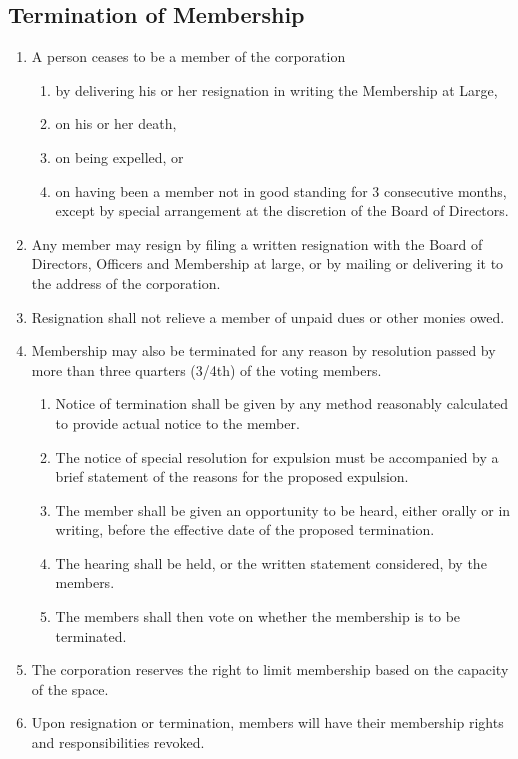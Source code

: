 \documentclass{article}
\begin{document}
\subsection{Termination of Membership}
\begin{enumerate}
    \item A person ceases to be a member of the corporation
    \begin{enumerate}
    \item by delivering his or her resignation in writing the Membership at
    Large,
    \item on his or her death,
    \item on being expelled, or
    \item on having been a member not in good standing for 3 consecutive months,
    except by special arrangement at the discretion of the Board of Directors.
    \end{enumerate}
    \item Any member may resign by filing a written resignation with the Board
    of Directors, Officers and Membership at large, or by mailing or delivering
    it to the address of the corporation.
    \item Resignation shall not relieve a member of unpaid dues or other monies
    owed.
    \item Membership may also be terminated for any reason by resolution passed
    by more than three quarters (3/4th) of the voting members.
    \begin{enumerate}
        \item Notice of termination shall be given by any method reasonably
    calculated to provide actual notice to the member.
        \item The notice of special resolution for expulsion must be accompanied
    by a brief statement of the reasons for the proposed expulsion.
        \item The member shall be given an opportunity to be heard, either
    orally or in writing, before the effective date of the proposed termination.
        \item The hearing shall be held, or the written statement considered, by
    the members.
        \item The members shall then vote on whether the membership is to be
    terminated.
    \end{enumerate}
    \item The corporation reserves the right to limit membership based on the
capacity of the space.
    \item Upon resignation or termination, members will have their membership
    rights and responsibilities revoked.
\end{enumerate}
\end{document}
